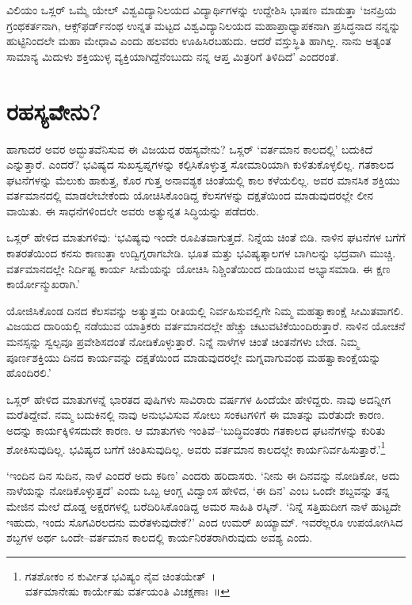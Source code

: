 ವಿಲಿಯಂ ಒಸ್ಲರ್ ಒಮ್ಮೆ ಯೇಲ್ ವಿಶ್ವವಿದ್ಯಾನಿಲಯದ ವಿದ್ಯಾರ್ಥಿಗಳನ್ನು ಉದ್ದೇಶಿಸಿ ಭಾಷಣ ಮಾಡುತ್ತಾ ‘ಜನಪ್ರಿಯ ಗ್ರಂಥಕರ್ತನಾಗಿ, ಆಕ್ಸ್​ಫರ್ಡ್​ನಂಥ ಉನ್ನತ ಮಟ್ಟದ ವಿಶ್ವ\-ವಿದ್ಯಾ\-ನಿಲಯದ ಮಹಾಪ್ರಾಧ್ಯಾಪಕನಾಗಿ ಪ್ರಸಿದ್ಧನಾದ ನನ್ನನ್ನು ಹುಟ್ಟಿನಿಂದಲೇ ಮಹಾ ಮೇಧಾವಿ ಎಂದು ಹಲವರು ಊಹಿಸಿರಬಹುದು. ಆದರೆ ವಸ್ತುಸ್ಥಿತಿ ಹಾಗಿಲ್ಲ. ನಾನು ಅತ್ಯಂತ ಸಾಮಾನ್ಯ ಮಿದುಳು ಶಕ್ತಿಯುಳ್ಳ ವ್ಯಕ್ತಿಯಾಗಿದ್ದೆನೆಂಬುದು ನನ್ನ ಆಪ್ತ ಮಿತ್ರರಿಗೆ ತಿಳಿದಿದೆ’ ಎಂದರಂತೆ.


\section*{ರಹಸ್ಯವೇನು?}


ಹಾಗಾದರೆ ಅವರ ಅದ್ಭುತವೆನಿಸುವ ಈ ವಿಜಯದ ರಹಸ್ಯವೇನು? ಒಸ್ಲರ್ ‘ವರ್ತಮಾನ ಕಾಲದಲ್ಲಿ’ ಬದುಕಿದೆ ಎನ್ನುತ್ತಾರೆ. ಎಂದರೆ? ಭವಿಷ್ಯದ ಸುಖಸ್ವಪ್ನಗಳನ್ನು ಕಲ್ಪಿಸಿಕೊಳ್ಳುತ್ತ ಸೋಮಾರಿಯಾಗಿ ಕುಳಿತುಕೊಳ್ಳಲಿಲ್ಲ. ಗತಕಾಲದ ಘಟನೆಗಳನ್ನು ಮೆಲುಕು ಹಾಕುತ್ತ, ಕೊರ ಗುತ್ತ ಅನಾವಶ್ಯಕ ಚಿಂತೆಯಲ್ಲಿ ಕಾಲ ಕಳೆಯಲಿಲ್ಲ. ಅವರ ಮಾನಸಿಕ ಶಕ್ತಿಯು ವರ್ತಮಾನದಲ್ಲಿ ಮಾಡಲೇಬೇಕೆಂದು ಯೋಚಿಸಿಕೊಂಡಿದ್ದ ಕೆಲಸಗಳನ್ನು ದಕ್ಷತೆಯಿಂದ ಮಾಡುವುದರಲ್ಲೇ ಲೀನ ವಾಯಿತು. ಈ ಸಾಧನೆಗಳಿಂದಲೇ ಅವರು ಅತ್ಯುನ್ನತ ಸಿದ್ಧಿಯನ್ನು ಪಡೆದರು.

ಒಸ್ಲರ್ ಹೇಳಿದ ಮಾತುಗಳಿವು: ‘ಭವಿಷ್ಯವು ಇಂದೇ ರೂಪಿತವಾಗುತ್ತದೆ. ನಿನ್ನೆಯ ಚಿಂತೆ ಬಿಡಿ. ನಾಳಿನ ಘಟನೆಗಳ ಬಗೆಗೆ ಕಾತರತೆಯಿಂದ ಕನಸು ಕಾಣುತ್ತಾ ಉದ್ವಿಗ್ನರಾಗಬೇಡಿ. ಭೂತ ಮತ್ತು ಭವಿಷ್ಯತ್ಕಾಲಗಳ ಬಾಗಿಲನ್ನು ಭದ್ರವಾಗಿ ಮುಚ್ಚಿ. ವರ್ತಮಾನದಲ್ಲೇ ನಿರ್ದಿಷ್ಟ ಕಾರ್ಯ ಸೀಮೆಯನ್ನು ಯೋಚಿಸಿ ನಿಶ್ಚಿಂತೆಯಿಂದ ದುಡಿಯುವ ಅಭ್ಯಾಸಮಾಡಿ. ಈ ಕ್ಷಣ ಕಾರ್ಯೋನ್ಮುಖರಾಗಿ.’

ಯೋಜಿಸಿಕೊಂಡ ದಿನದ ಕೆಲಸವನ್ನು ಅತ್ಯುತ್ತಮ ರೀತಿಯಲ್ಲಿ ನಿರ್ವಹಿಸುವಲ್ಲಿಗೇ ನಿಮ್ಮ ಮಹತ್ವಾಕಾಂಕ್ಷೆ ಸೀಮಿತವಾಗಲಿ. ವಿಜಯದ ದಾರಿಯಲ್ಲಿ ನಡೆಯುವ ಯಾತ್ರಿಕರು ವರ್ತಮಾನದಲ್ಲೇ ಹೆಚ್ಚು ಚಟುವಟಿಕೆಯಿಂದಿರುತ್ತಾರೆ. ನಾಳಿನ ಯೋಚನೆ ಮನಸ್ಸನ್ನು ಸ್ವಲ್ಪವೂ ಪ್ರವೇಶಿಸದಂತೆ ನೋಡಿಕೊಳ್ಳುತ್ತಾರೆ. ನಿನ್ನೆ ನಾಳೆಗಳ ಚಿಂತೆ ಚಿಂತನೆಗಳು ಬೇಡ. ನಿಮ್ಮ ಪೂರ್ಣಶಕ್ತಿಯು ದಿನದ ಕಾರ್ಯವನ್ನು ದಕ್ಷತೆಯಿಂದ ಮಾಡುವುದರಲ್ಲೇ ಮಗ್ನವಾಗುವಂಥ ಮಹತ್ವಾಕಾಂಕ್ಷೆಯನ್ನು ಹೊಂದಿರಲಿ.’

ಒಸ್ಲರ್ ಹೇಳಿದ ಮಾತುಗಳನ್ನೆ ಭಾರತದ ಪುಷಿಗಳು ಸಾವಿರಾರು ವರ್ಷಗಳ ಹಿಂದೆಯೇ ಹೇಳಿದ್ದರು. ನಾವು ಅದನ್ನೀಗ ಮರೆತಿದ್ದೇವೆ. ನಮ್ಮ ಬದುಕಿನಲ್ಲಿ ನಾವು ಅನುಭವಿಸುವ ಸೋಲು ಸಂಕಟಗಳಿಗೆ ಈ ಮಾತನ್ನು ಮರೆತುದೇ ಕಾರಣ. ಅದನ್ನು ಕಾರ್ಯಕ್ಕಿಳಿಸದುದೇ ಕಾರಣ. ಆ ಮಾತುಗಳು ಇಂತಿವೆ–‘ಬುದ್ಧಿವಂತರು ಗತಕಾಲದ ಘಟನೆಗಳನ್ನು ಕುರಿತು ಶೋಕಿಸುವುದಿಲ್ಲ. ಭವಿಷ್ಯದ ಬಗೆಗೆ ಚಿಂತಿಸುವುದಿಲ್ಲ. ಅವರು ವರ್ತಮಾನ ಕಾಲದಲ್ಲೇ ಕಾರ್ಯನಿರ್ವಹಿಸುತ್ತಾರೆ.’\footnote{ಗತಶೋಕಂ ನ ಕುರ್ವೀತ ಭವಿಷ್ಯಂ ನೈವ ಚಿಂತಯೇತ್~।\\\phantom{ವರ್ತ} ವರ್ತಮಾನೇಷು ಕಾರ್ಯೇಷು ವರ್ತಯಂತಿ ವಿಚಕ್ಷಣಾಃ~॥}

‘ಇಂದಿನ ದಿನ ಸುದಿನ, ನಾಳೆ ಎಂದರೆ ಅದು ಕಠಿಣ’ ಎಂದರು ಹರಿದಾಸರು. ‘ನೀನು ಈ ದಿನವನ್ನು ನೋಡಿಕೋ, ಅದು ನಾಳೆಯನ್ನು ನೋಡಿಕೊಳ್ಳುತ್ತದೆ’ ಎಂದು ಒಬ್ಬ ಆಂಗ್ಲ ವಿದ್ವಾಂಸ ಹೇಳಿದ, ‘ಈ ದಿನ’ ಎಂಬ ಒಂದೇ ಶಬ್ದವನ್ನು ತನ್ನ ಮೇಜಿನ ಮೇಲೆ ದೊಡ್ಡ ಅಕ್ಷರಗಳಲ್ಲಿ ಬರೆದಿರಿಸಿಕೊಂಡಿದ್ದ ಅಮರ ಸಾಹಿತಿ ರಸ್ಕಿನ್. ‘ನಿನ್ನೆ ಸತ್ತಿಹುದೀಗ ನಾಳೆ ಹುಟ್ಟದೇ ಇಹುದು, ಇಂದು ಸೊಗವಿರಲದನು ಮರೆತಳುವುದೇಕೆ?’ ಎಂದ ಉಮರ್ ಖಯ್ಯಾಮ್. ಇವರೆಲ್ಲರೂ ಉಪಯೋಗಿಸಿದ ಶಬ್ದಗಳ ಅರ್ಥ ಒಂದೇ–ವರ್ತಮಾನ ಕಾಲದಲ್ಲಿ ಕಾರ್ಯನಿರತರಾಗಿರುವುದು ಅವಶ್ಯ ಎಂದು.

